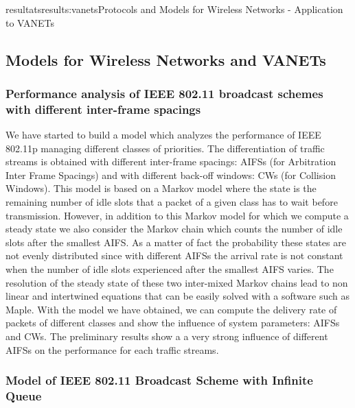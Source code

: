\documentclass{ra2016}
\begin{document}
\begin{module}{resultats}{results:vanets}{Protocols and Models for Wireless Networks - Application to VANETs}
\subsection{Models for Wireless Networks and VANETs}

\subsubsection{Performance analysis of IEEE 802.11 broadcast schemes with different inter-frame spacings}

\begin{participants}
\end{participants}

We have started to build a model which analyzes the performance 
of IEEE 802.11p managing different classes of priorities. 
The differentiation of traffic streams is obtained with different 
inter-frame spacings:  AIFSs (for Arbitration Inter Frame Spacings) and with 
different back-off windows: CWs (for Collision Windows). 
This model is based on a Markov model where the state is the remaining 
number of idle slots that a packet of a given class has to wait before transmission. 
However, in addition to this Markov model for which we compute a steady state 
we also consider the Markov chain which counts the number of idle slots after 
the smallest AIFS. As a matter of fact the probability these states are not evenly 
distributed since with different AIFSs the arrival rate is not constant 
when the number of idle slots experienced after the smallest AIFS varies. 
The resolution of the steady state of these two inter-mixed Markov chains
lead to non linear and intertwined equations that can be easily  solved with a software 
such as Maple. 
With the model we have obtained, we can compute the delivery rate 
of packets of different classes and show the influence of system parameters: 
AIFSs and CWs. The preliminary results show a a very strong influence 
of different AIFSs on the performance for each traffic streams.  

\subsubsection{Model of IEEE 802.11 Broadcast Scheme with Infinite Queue}


\end{module}
\end{document}
